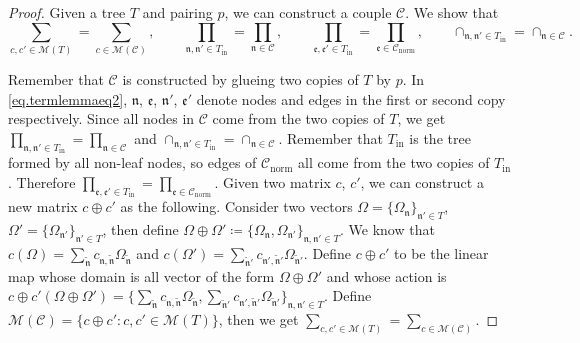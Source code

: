 \begin{proof}
Given a tree $T$ and pairing $p$, we can construct a couple $\mathcal{C}$. We show that 
\begin{equation}\label{eq.termlemmaeq4}
\sum_{c, c'\in \mathscr{M}(T) }=\sum_{c\in \mathscr{M}(\mathcal{C}) },\qquad \prod_{\mathfrak{n}, \mathfrak{n}'\in T_{\text{in}}}=\prod_{\mathfrak{n}\in \mathcal{C}}, \qquad \prod_{\mathfrak{e},\mathfrak{e}'\in T_{\text{in}}}=\prod_{\mathfrak{e}\in \mathcal{C}_{\text{norm}}},\qquad \cap_{\mathfrak{n},\mathfrak{n}'\in T_{\text{in}}}=\cap_{\mathfrak{n}\in \mathcal{C}}.    
\end{equation}


Remember that $\mathcal{C}$ is constructed by glueing two copies of $T$ by $p$. In \eqref{eq.termlemmaeq2}, $\mathfrak{n}$, $\mathfrak{e}$, $\mathfrak{n}'$, $\mathfrak{e}'$ denote nodes and edges in the first or second copy respectively. Since all nodes in $\mathcal{C}$ come from the two copies of $T$, we get $\prod_{\mathfrak{n}, \mathfrak{n}'\in T_{\text{in}}}=\prod_{\mathfrak{n}\in \mathcal{C}}$ and $\cap_{\mathfrak{n},\mathfrak{n}'\in T_{\text{in}}}=\cap_{\mathfrak{n}\in \mathcal{C}}$. Remember that $T_{\text{in}}$ is the tree formed by all non-leaf nodes, so edges of $\mathcal{C}_{\text{norm}}$ all come from the two copies of $T_{\text{in}}$. Therefore $\prod_{\mathfrak{e},\mathfrak{e}'\in T_{\text{in}}}=\prod_{\mathfrak{e}\in \mathcal{C}_{\text{norm}}}$. Given two matrix $c$, $c'$, we can construct a new matrix $c\oplus c'$ as the following. Consider two vectors $\Omega=\{\Omega_{\mathfrak{n}}\}_{\mathfrak{n}'\in T}$, $\Omega'=\{\Omega_{\mathfrak{n}'}\}_{\mathfrak{n}'\in T}$, then define $\Omega\oplus\Omega'\coloneqq \{\Omega_{\mathfrak{n}},\Omega_{\mathfrak{n}'}\}_{\mathfrak{n},\mathfrak{n}'\in T}$. We know that $c(\Omega)=\sum_{\widetilde{\mathfrak{n}}}c_{\mathfrak{n},\widetilde{\mathfrak{n}}}\Omega_{\widetilde{\mathfrak{n}}}$ and $c(\Omega')=\sum_{\widetilde{\mathfrak{n}}'}c_{\mathfrak{n}',\widetilde{\mathfrak{n}}'}\Omega_{\widetilde{\mathfrak{n}}'}$. Define $c\oplus c'$ to be the linear map whose domain is all vector of the form $\Omega\oplus\Omega'$ and whose action is $c\oplus c'(\Omega\oplus\Omega')=\{\sum_{\widetilde{\mathfrak{n}}}c_{\mathfrak{n},\widetilde{\mathfrak{n}}}\Omega_{\widetilde{\mathfrak{n}}},\sum_{\widetilde{\mathfrak{n}}'}c_{\mathfrak{n}',\widetilde{\mathfrak{n}}'}\Omega_{\widetilde{\mathfrak{n}}'}\}_{\mathfrak{n},\mathfrak{n}'\in T}$. Define $\mathscr{M}(\mathcal{C})=\{c\oplus c':c, c'\in \mathscr{M}(T)\}$, then we get $\sum_{c, c'\in \mathscr{M}(T) }=\sum_{c\in \mathscr{M}(\mathcal{C}) }$.




\end{proof}
